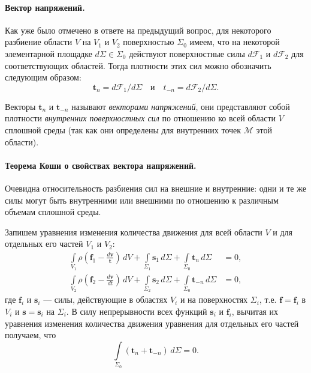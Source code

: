 
\paragraph{Вектор напряжений.} Как уже было отмечено в ответе на предыдущий вопрос, для некоторого разбиение области $V$ на $V_1$ и $V_2$ поверхностью $\Sigma_0$ имеем, что на некоторой элементарной площадке $d\Sigma \in \Sigma_0$ действуют поверхностные силы $d \mathcal{F}_1$ и $d \mathcal{F}_2$ для соответствующих областей. Тогда плотности этих сил можно обозначить следующим образом: 
\begin{equation*}
	\mathbf{t}_{n} = d\mathcal{F}_1 / d\Sigma \quad \text{и} \quad t_{-n} = d\mathcal{F}_2 / d\Sigma.
\end{equation*} 

Векторы $\mathbf{t}_n$ и $\mathbf{t}_{-n}$ называют \textit{векторами напряжений}, они представляют собой плотности \textit{внутренних поверхностных сил} по отношению ко всей области $V$ сплошной среды (так как они определены для внутренних точек $\mathcal{M}$ этой области). 

\paragraph{Теорема Коши о свойствах вектора напряжений.} Очевидна относительность разбиения сил на внешние и внутренние: одни и те же силы могут быть внутренними или внешними по отношению к различным объемам сплошной среды. 

Запишем уравнения изменения количества движения для всей области $V$ и для отдельных его частей $V_1$ и $V_2$:
\begin{align*}
	\int\limits_{V_1} \rho \left(\mathbf{f}_1 - \frac{d \mathbf{v}}{\mathbf{t}}\right) \, dV + \int\limits_{\Sigma_1} \mathbf{s}_1 \, d\Sigma + \int\limits_{\Sigma_0} \mathbf{t}_n \, d\Sigma &= 0, \\
	\int\limits_{V_2} \rho \left(\mathbf{f}_2 - \frac{d\mathbf{v}}{dt}\right) \, dV + \int\limits_{\Sigma_2} \mathbf{s}_2 \, d\Sigma + \int\limits_{\Sigma_0} \mathbf{t}_{-n} \, d\Sigma &= 0,
\end{align*}
где $\mathbf{f}_i$ и $\mathbf{s}_i$ --- силы, действующие в областях $V_i$ и на поверхностях $\Sigma_i$, т.е. $\mathbf{f} = \mathbf{f}_i$ в $V_i$ и $\mathbf{s} = \mathbf{s}_i$ на $\Sigma_i$. В силу непрерывности всех функций $\mathbf{s}_i$ и $\mathbf{f}_i$, вычитая их уравнения изменения количества движения уравнения для отдельных его частей получаем, что
\begin{equation*}
	\int\limits_{\Sigma_0} \left(\mathbf{t}_n + \mathbf{t}_{-n}\right) \, d\Sigma = 0.
\end{equation*}

